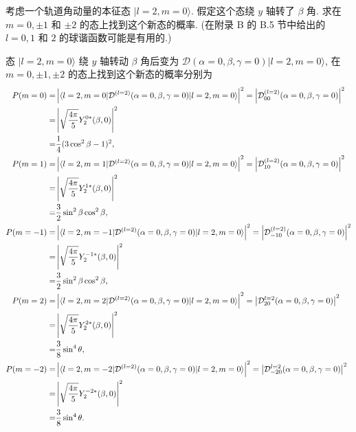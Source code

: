 \documentclass{assignment}
\begin{document}
\begin{prob}[课本习题 3.20]
    考虑一个轨道角动量的本征态 $\lvert l=2,m=0\rangle$. 假定这个态绕 $y$ 轴转了 $\beta$ 角. 求在 $m=0,\pm 1$ 和 $\pm 2$ 的态上找到这个新态的概率. (在附录 B 的 B.5 节中给出的 $l=0,1$ 和 $2$ 的球谐函数可能是有用的.)
\end{prob}
\begin{sol}
    态 $\lvert l=2,m=0\rangle$ 绕 $y$ 轴转动 $\beta$ 角后变为 $\mathcal{D}(\alpha=0,\beta,\gamma=0)\lvert l=2,m=0\rangle$, 在 $m=0,\pm 1,\pm 2$ 的态上找到这个新态的概率分别为
    \begin{align}
        \notag P(m=0)=&\left\lvert\langle l=2,m=0\rvert\mathcal{D}^{(l=2)}(\alpha=0,\beta,\gamma=0)\lvert l=2,m=0\rangle\right\rvert^2=\left\lvert\mathcal{D}_{00}^{(l=2)}(\alpha=0,\beta,\gamma=0)\right\rvert^2\\
        \notag=&\left\lvert\sqrt{\frac{4\pi}{5}}Y_2^{0*}(\beta,0)\right\rvert^2\\
        =&\frac{1}{4}(3\cos^2\beta-1)^2,\\
        \notag P(m=1)=&\left\lvert\langle l=2,m=1\rvert\mathcal{D}^{(l=2)}(\alpha=0,\beta,\gamma=0)\lvert l=2,m=0\rangle\right\rvert^2=\left\lvert\mathcal{D}_{10}^{(l=2)}(\alpha=0,\beta,\gamma=0)\right\rvert^2\\
        \notag=&\left\lvert\sqrt{\frac{4\pi}{5}}Y_2^{1*}(\beta,0)\right\rvert^2\\
        =&\frac{3}{2}\sin^2\beta\cos^2\beta,\\
        \notag P(m=-1)=&\left\lvert\langle l=2,m=-1\rvert\mathcal{D}^{(l=2)}(\alpha=0,\beta,\gamma=0)\lvert l=2,m=0\rangle\right\rvert^2=\left\lvert\mathcal{D}_{-10}^{(l=2)}(\alpha=0,\beta,\gamma=0)\right\rvert^2\\
        \notag=&\left\lvert\sqrt{\frac{4\pi}{5}}Y_2^{-1*}(\beta,0)\right\rvert^2\\
        =&\frac{3}{2}\sin^2\beta\cos^2\beta,\\
        \notag P(m=2)=&\left\lvert\langle l=2,m=2\rvert\mathcal{D}^{(l=2)}(\alpha=0,\beta,\gamma=0)\lvert l=2,m=0\rangle\right\rvert^2=\left\lvert\mathcal{D}_{20}^{l=2}(\alpha=0,\beta,\gamma=0)\right\rvert^2\\
        \notag=&\left\lvert\sqrt{\frac{4\pi}{5}}Y_2^{2*}(\beta,0)\right\rvert^2\\
        =&\frac{3}{8}\sin^4\theta,\\
        \notag P(m=-2)=&\left\lvert\langle l=2,m=-2\rvert\mathcal{D}^{(l=2)}(\alpha=0,\beta,\gamma=0)\lvert l=2,m=0\rangle\right\rvert^2=\left\lvert\mathcal{D}_{-20}^{l=2}(\alpha=0,\beta,\gamma=0)\right\rvert^2\\
        \notag=&\left\lvert\sqrt{\frac{4\pi}{5}}Y_2^{-2*}(\beta,0)\right\rvert^2\\
        =&\frac{3}{8}\sin^4\theta.
    \end{align}
\end{sol}
\end{document}
